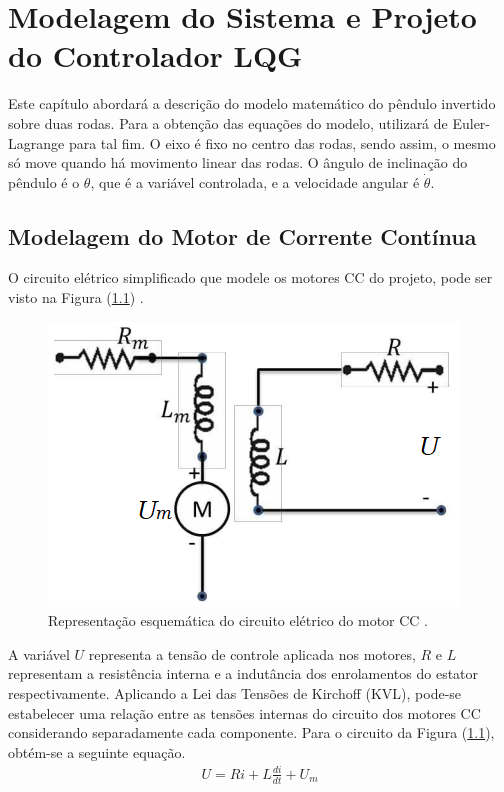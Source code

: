 \chapter{Modelagem do Sistema e Projeto do Controlador LQG}\label{cap:ModelagemProjetoControlador}

Este capítulo abordará a descrição do modelo matemático do pêndulo invertido sobre duas rodas. Para a obtenção das equações do modelo, utilizará de Euler-Lagrange para tal fim. O eixo é fixo no centro das rodas, sendo assim, o mesmo só move quando há movimento linear das rodas. O ângulo de inclinação do pêndulo é o $\theta$, que é a variável controlada, e a velocidade angular é $\dot{\theta}$.

\section{Modelagem do Motor de Corrente Contínua}\label{sec:ModeloEletricoMotor}

O circuito elétrico simplificado que modele os motores CC do projeto, pode ser visto na Figura (\ref{fig:M-motor}) \citep{Silva:17}. 
\begin{figure}[H]
	\centering
	\includegraphics[scale=0.8]{Modelagem/Circuito_MotorDC.png}
	\caption{Representação esquemática do circuito elétrico do motor CC \citep{Silva:17}.}
	\label{fig:M-motor}
\end{figure}    

A variável $U$ representa a tensão de controle aplicada nos motores, $R$ e $L$ representam a resistência interna e a indutância dos enrolamentos do estator respectivamente. Aplicando a Lei das Tensões de Kirchoff (KVL), pode-se estabelecer uma relação entre as tensões internas do circuito dos motores CC considerando separadamente cada componente. Para o circuito da Figura (\ref{fig:M-motor}), obtém-se a seguinte equação.
\begin{gather}
	U = Ri + L\frac{di}{dt} + U_m\label{eq:eqEletricaMotor}
\end{gather}

